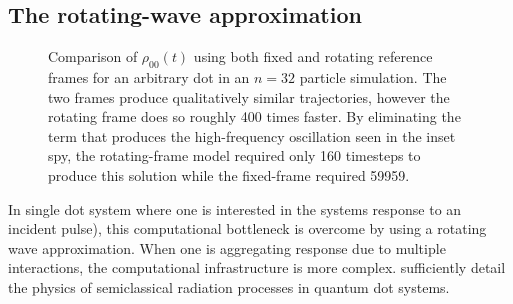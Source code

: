 \documentclass[conference]{IEEEtran}
\begin{document}
\subsection{The rotating-wave approximation}
\begin{figure}
  \centering
  
  \caption{\label{fig:frame comparison}
    Comparison of $\rho_{00}(t)$ using both fixed and rotating reference frames for an arbitrary dot in an $n=32$ particle simulation.
    The two frames produce qualitatively similar trajectories, however the rotating frame does so roughly 400 times faster.
    By eliminating the term that produces the high-frequency oscillation seen in the inset spy, the rotating-frame model required only 160 timesteps to produce this solution while the fixed-frame required 59959.
  }
\end{figure}

In single dot system where one is interested in the systems response to an incident pulse), this computational bottleneck is overcome by using a rotating wave approximation.
When one is aggregating response due to multiple interactions, the computational infrastructure is more complex.
 sufficiently detail the physics of semiclassical radiation processes in quantum dot systems.
\end{document}
